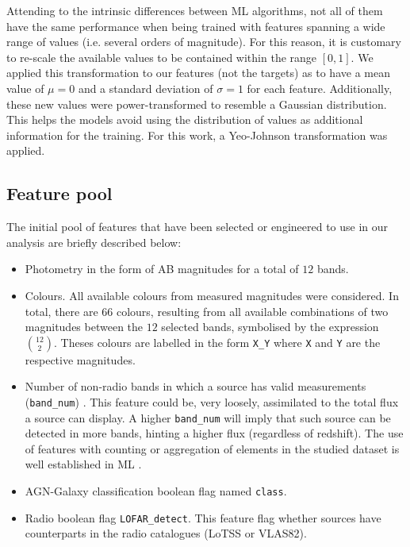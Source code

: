 \documentclass{aa}
\begin{document}
Attending to the intrinsic differences between ML algorithms, not all of them have the same performance when being trained with features spanning a wide range of values (i.e. several orders of magnitude). For this reason, it is customary to re-scale the available values to be contained within the range $[0, 1]$. We applied this transformation to our features (not the targets) as to have a mean value of $\mu = 0$ and a standard deviation of $\sigma = 1$ for each feature. Additionally, these new values were power-transformed to resemble a Gaussian distribution. This helps the models avoid using the distribution of values as additional information for the training. For this work, a Yeo-Johnson transformation \citep{10.1093/biomet/87.4.954} was applied.


\subsection{Feature pool}\label{sec:feature_creation}


The initial pool of features that have been selected or engineered to use in our analysis are briefly described below:

\begin{itemize}
    \item Photometry in the form of AB magnitudes for a total of $12$ bands.
    
    \item Colours. All available colours from measured magnitudes were considered. In total, there are $66$ colours, resulting from all available combinations of two magnitudes between the $12$ selected bands, symbolised by the expression $\binom{12}{2}$. Theses colours are labelled in the form \verb|X_Y| where \verb|X| and \verb|Y| are the respective magnitudes.

    \item Number of non-radio bands in which a source has valid measurements (\verb|band_num|) . This feature could be, very loosely, assimilated to the total flux a source can display. A higher \verb|band_num| will imply that such source can be detected in more bands, hinting a higher flux (regardless of redshift). The use of features with counting or aggregation of elements in the studied dataset is well established in ML \citep[see, for example,][]{zheng2018feature, duboue2020art, 2021AJ....161..141S}.
    
    \item AGN-Galaxy classification boolean flag named \verb|class|.
    \item Radio boolean flag \verb|LOFAR_detect|. This feature flag whether sources have counterparts in the radio catalogues (LoTSS or VLAS82).
\end{itemize}
\end{document}
